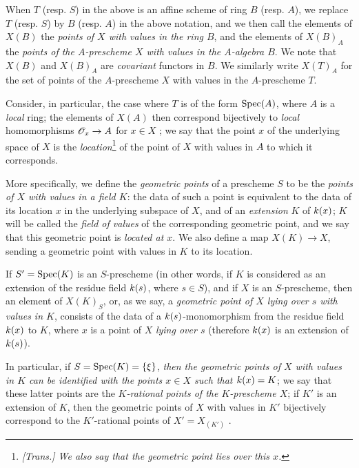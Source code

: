 \begin{env}[3.4.4]
\label{1.3.4.4}
When $T$ (resp. $S$) in the above is an affine scheme of ring $B$ (resp. $A$), we replace
$T$ (resp. $S$) by $B$ (resp. $A$) in the above notation, and we then call the elements of
$X(B)$ the \emph{points of $X$ with values in the ring $B$}, and the elements of $X(B)_A$ the
\emph{points of the $A$-prescheme $X$ with values in the $A$-algebra $B$}. We note that
$X(B)$ and $X(B)_A$ are \emph{covariant} functors in $B$. We similarly write $X(T)_A$ for the
set of points of the $A$-prescheme $X$ with values in the $A$-prescheme $T$.
\end{env}

\begin{env}[3.4.5]
\label{1.3.4.5}
Consider, in particular, the case where $T$ is of the form $\operatorname{Spec}(A)$, where $A$ is a
\emph{local} ring; the elements of $X(A)$ then correspond bijectively to \emph{local}
homomorphisms $\sh{O}_x\to A$ for $x\in X$ ; we say that the
point $x$ of the underlying space of $X$ is the \emph{location}\footnote{\emph{[Trans.] We also say that
\emph{the geometric point lies over this $x$}.}} of the point of $X$ with values in $A$ to which it corresponds.

More specifically, we define the \emph{geometric points} of a prescheme $S$ to be the \emph{points of
$X$ with values in a field $K$}: the data of such a point is equivalent to the data of its
location $x$ in the underlying subspace of $X$, and of an \emph{extension} $K$ of $k(x)$;
$K$ will be called the \emph{field of values} of the corresponding geometric point, and we
say that this geometric point is \emph{located at $x$}. We also define a map $X(K)\to X$,
sending a geometric point with values in $K$ to its location.

If $S'=\operatorname{Spec}(K)$ is an $S$-prescheme (in other words, if $K$ is considered as an extension
of the residue field $k(s)$, where $s\in S$), and if $X$ is an $S$-prescheme, then an
element of $X(K)_S$, or, as we say, a \emph{geometric point of $X$ lying over $s$ with values
in $K$}, consists of the data of a $k(s)$-monomorphism from the residue field $k(x)$
to $K$, where $x$ is a point of $X$ \emph{lying over $s$} (therefore $k(x)$ is an
extension of $k(s)$).

In particular, if $S=\operatorname{Spec}(K)=\{\xi\}$, \emph{then the geometric points of $X$ with values in
$K$ can be identified with the points $x\in X$ such that $k(x)=K$}; we say that these latter
points are the \emph{$K$-rational points of the $K$-prescheme $X$}; if $K'$ is an extension
of $K$, then the geometric points of $X$ with values in $K'$ bijectively correspond to the
$K'$-rational points of $X'=X_{(K')}$ .
\end{env}


